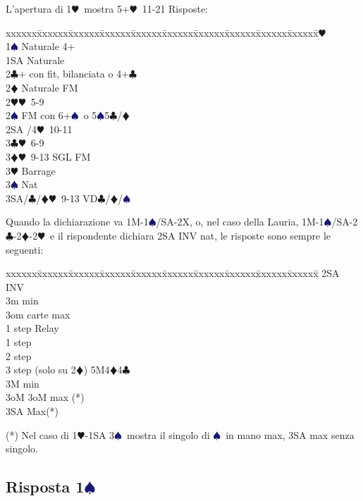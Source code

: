 \documentclass[a4paper,italian]{article}
\newcommand{\BC}{\textcolor{OliveGreen}{$\clubsuit$}}
\newcommand{\BD}{\textcolor{RedOrange}{$\vardiamondsuit$}}
\newcommand{\BH}{\textcolor{Red2}{$\varheartsuit${}}}
\newcommand{\BS}{\textcolor{MidnightBlue}{$\spadesuit${}}}
\newcommand{\pdfs}{\texorpdfstring{\BS{}}{S}}
\newenvironment{bidtable}
{\begin{tabbing}

    xxxxxx\=xxxxxx\=xxxxxx\=xxxxxx\=xxxxxx\=xxxxxx\=xxxxxx\=xxxxxx\=xxxxxx\=xxxxxx\=\kill}
{\end{tabbing} }%
\newenvironment{sviluppi}
{\begin{tcolorbox}[colframe=azzurro,title=Sviluppi particolari]}
    {
\end{tcolorbox} }%
\begin{document}
\begin{multicols*}{2}
    L'apertura di 1\BH\ mostra 5+\BH\ 11-21
    Risposte:
    \begin{bidtable}
        1\BH\+\\
        1\BS \>\> Naturale 4+\\
        1SA \>\> Naturale\\
        2\BC \>+ con fit, bilanciata o 4+\BC \\
        2\BD \>\> Naturale FM\\
        2\BH \>\BH\ 5-9\\
        2\BS \>\> FM con 6+\BS\ o 5\BS 5\BC /\BD \\
        2SA \>/4\BH\ 10-11\\
        3\BC \>\BH\ 6-9\\
        3\BD \>\BH\ 9-13 SGL FM\\
        3\BH \>\> Barrage\\
        3\BS \>\> Nat\\
        3SA/\BC/\BD \>\BH\ 9-13 VD\BC /\BD /\BS \-
    \end{bidtable}

    \begin{sviluppi}\label{1Maggiore}
        Quando la dichiarazione va 1M-1\BS/SA-2X, o, nel caso della Lauria, 1M-1\BS/SA-2\BC-2\BD-2\BH\ e il rispondente dichiara 2SA INV nat, le risposte sono sempre le seguenti:
        \smallbreak
        \begin{bidtable}
            2SA \> INV\+\\
            3m  min\\
            3om  carte max\+\\
            1 step \> Relay\+\\
            1 step \\
            2 step \\
            3 step (solo su 2\BD)\>\> \> 5M4\BD4\BC\-\-\\
            3M  min\\
            3oM \> 3oM max (*)\\
            3SA \> Max(*)\-\\
        \end{bidtable}
        (*) Nel caso di 1\BH-1SA 3\BS\ mostra il singolo di \BS\ in mano max, 3SA max senza singolo.
    \end{sviluppi}

    \subsection{Risposta 1\pdfs}


\end{multicols*}
\end{document}
